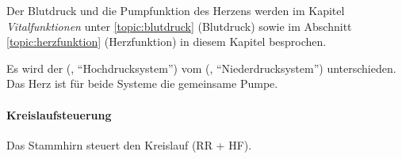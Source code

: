 
Der Blutdruck und die Pumpfunktion des Herzens werden im
Kapitel \emph{Vitalfunktionen} unter \ref{topic:blutdruck}
(Blutdruck) sowie im Abschnitt \ref{topic:herzfunktion}
(Herzfunktion) in diesem Kapitel besprochen.

Es wird der  (,
"`Hochdrucksystem"') vom 
(,
"`Niederdrucksystem"') unterschieden. Das Herz ist f\"ur 
beide Systeme die gemeinsame Pumpe.

\paragraph{Kreislaufsteuerung}

Das Stammhirn steuert den Kreislauf (RR + HF).

